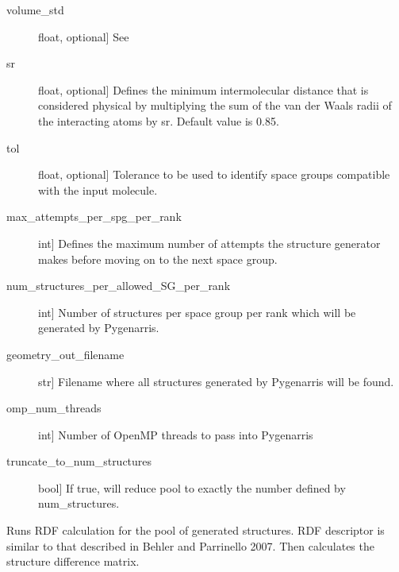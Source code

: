 \documentclass[letterpaper,10pt,english]{sphinxmanual}
\begin{document}
\begin{fulllineitems}
\begin{fulllineitems}
\begin{description}
\item[{volume\_std}] \leavevmode{[}float, optional{]}
See {\hyperref[\detokenize{index:Genarris.genarris_master.Genarris.Estimate_Unit_Cell_Volume}]{}}

\item[{sr}] \leavevmode{[}float, optional{]}
Defines the minimum intermolecular distance that is considered
physical by multiplying the sum of the van der Waals radii of the
interacting atoms by sr. Default value is 0.85.

\item[{tol}] \leavevmode{[}float, optional{]}
Tolerance to be used to identify space groups compatible with the
input molecule.

\item[{max\_attempts\_per\_spg\_per\_rank}] \leavevmode{[}int{]}
Defines the maximum number of attempts the structure generator
makes before moving on to the next space group.

\item[{num\_structures\_per\_allowed\_SG\_per\_rank}] \leavevmode{[}int{]}
Number of structures per space group per rank which will be
generated by Pygenarris.

\item[{geometry\_out\_filename}] \leavevmode{[}str{]}
Filename where all structures generated by Pygenarris will be found.

\item[{omp\_num\_threads}] \leavevmode{[}int{]}
Number of OpenMP threads to pass into Pygenarris

\item[{truncate\_to\_num\_structures}] \leavevmode{[}bool{]}
If true, will reduce pool to exactly the number defined by
num\_structures.

\end{description}

\end{fulllineitems}


\begin{fulllineitems}
\label{\detokenize{index:Genarris.genarris_master.Genarris.Run_Rdf_Calc}}
Runs RDF calculation for the pool of generated structures. RDF
descriptor is similar to that described in Behler and Parrinello 2007.
Then calculates the structure difference matrix.

\end{fulllineitems}
\end{fulllineitems}
\end{document}
